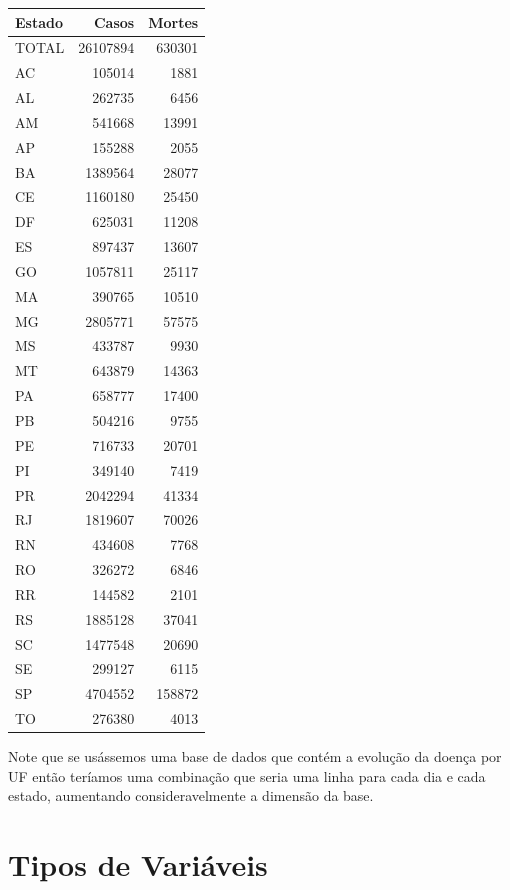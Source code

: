 \documentclass[
]{book}
\begin{document}
\begin{tabular}{l|r|r}
\hline
Estado & Casos & Mortes\\
\hline
TOTAL & 26107894 & 630301\\
\hline
AC & 105014 & 1881\\
\hline
AL & 262735 & 6456\\
\hline
AM & 541668 & 13991\\
\hline
AP & 155288 & 2055\\
\hline
BA & 1389564 & 28077\\
\hline
CE & 1160180 & 25450\\
\hline
DF & 625031 & 11208\\
\hline
ES & 897437 & 13607\\
\hline
GO & 1057811 & 25117\\
\hline
MA & 390765 & 10510\\
\hline
MG & 2805771 & 57575\\
\hline
MS & 433787 & 9930\\
\hline
MT & 643879 & 14363\\
\hline
PA & 658777 & 17400\\
\hline
PB & 504216 & 9755\\
\hline
PE & 716733 & 20701\\
\hline
PI & 349140 & 7419\\
\hline
PR & 2042294 & 41334\\
\hline
RJ & 1819607 & 70026\\
\hline
RN & 434608 & 7768\\
\hline
RO & 326272 & 6846\\
\hline
RR & 144582 & 2101\\
\hline
RS & 1885128 & 37041\\
\hline
SC & 1477548 & 20690\\
\hline
SE & 299127 & 6115\\
\hline
SP & 4704552 & 158872\\
\hline
TO & 276380 & 4013\\
\hline
\end{tabular}

Note que se usássemos uma base de dados que contém a evolução da doença por UF então teríamos uma combinação que seria uma linha para cada dia e cada estado, aumentando consideravelmente a dimensão da base.

\hypertarget{tipos-de-variuxe1veis}{%
\section{Tipos de Variáveis}\label{tipos-de-variuxe1veis}}
\end{document}

